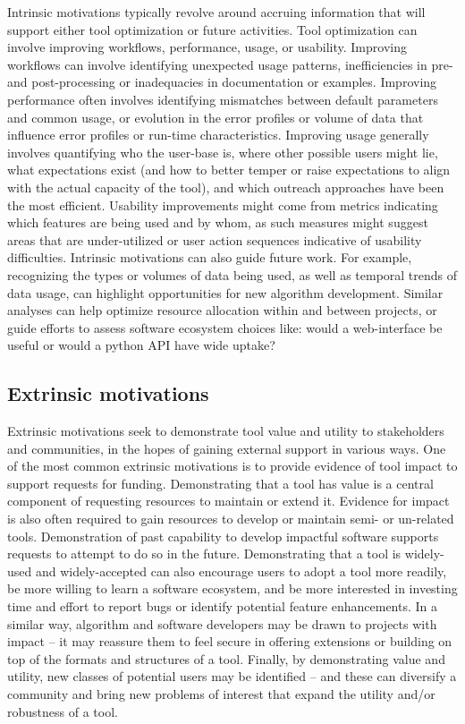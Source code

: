 \documentclass{article}
\begin{document}
Intrinsic motivations typically revolve around accruing information that will support either tool optimization or future activities. Tool optimization can involve improving workflows, performance, usage, or usability. Improving workflows can involve identifying unexpected usage patterns, inefficiencies in pre- and post-processing or inadequacies in documentation or examples. Improving performance often involves identifying mismatches between default parameters and common usage, or evolution in the error profiles or volume of data that influence error profiles or run-time characteristics. Improving usage generally involves quantifying who the user-base is, where other possible users might lie, what expectations exist (and how to better temper or raise expectations to align with the actual capacity of the tool), and which outreach approaches have been the most efficient.  Usability improvements might come from metrics indicating which features are being used and by whom, as such measures might suggest areas that are under-utilized or user action sequences indicative of usability difficulties. 
Intrinsic motivations can also guide future work. For example, recognizing the types or volumes of data being used, as well as temporal trends of data usage, can highlight opportunities for new algorithm development. Similar analyses can help optimize resource allocation within and between projects, or guide efforts to assess software ecosystem choices like: would a web-interface be useful or would a python API have wide uptake? 

\subsection{Extrinsic motivations}
 
Extrinsic motivations seek to demonstrate tool value and utility to stakeholders and communities, in the hopes of gaining external support in various ways.  One of the most common extrinsic motivations is to provide evidence of tool impact to support requests for funding. Demonstrating that a tool has value is a central component of requesting resources to maintain or extend it.  Evidence for impact is also often required to gain resources to develop or maintain semi- or un-related tools. Demonstration of past capability to develop impactful software supports requests to attempt to do so in the future.  Demonstrating that a tool is widely-used and widely-accepted can also encourage users to adopt a tool more readily, be more willing to learn a software ecosystem, and be more interested in investing time and effort to report bugs or identify potential feature enhancements. In a similar way, algorithm and software developers may be drawn to projects with impact -- it may reassure them to feel secure in offering extensions or building on top of the formats and structures of a tool.  Finally, by demonstrating value and utility, new classes of potential users may be identified -- and these can diversify a community and bring new problems of interest that expand the utility and/or robustness of a tool.
\end{document}
